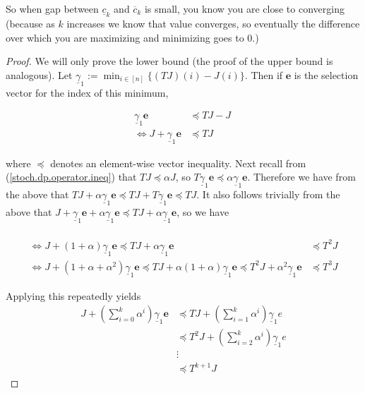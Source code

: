 \begin{enumerate}
\begin{theorem}
\end{theorem}

So when gap between \(\underline{c}_k \) and \(\overline{c}_k \) is small, you know you are close to converging (because as \(k\) increases we know that value converges, so eventually the difference over which you are maximizing and minimizing goes to 0.) 

\begin{proof}

We will only prove the lower bound (the proof of the upper bound is analogous). Let \(\underline{\gamma}_{1} := \min_{i \in [n]} \{ (TJ)(i) - J(i)\}\). Then if \(\boldsymbol{e}\) is the selection vector for the index of this minimum,

\begin{align*}
\underline{\gamma}_{1}\boldsymbol{e}& \preceq TJ - J  
\\ \iff J + \underline{\gamma}_{1}\boldsymbol{e} &  \preceq TJ \qquad 
\end{align*}

where \( \preceq\) denotes an element-wise vector inequality. Next recall from (\ref{stoch.dp.operator.ineq}) that \(TJ \preceq \alpha J\), so \(T \underline{\gamma}_{1}\boldsymbol{e} \preceq \alpha \underline{\gamma}_{1}\boldsymbol{e}\). Therefore we have from the above that \(TJ + \alpha \underline{\gamma}_{1}\boldsymbol{e} \preceq TJ +  T \underline{\gamma}_{1}\boldsymbol{e} \preceq TJ\). It also follows trivially from the above that \(J + \underline{\gamma}_{1}\boldsymbol{e}  + \alpha \underline{\gamma}_{1}\boldsymbol{e}    \preceq TJ  + \alpha \underline{\gamma}_{1}\boldsymbol{e}  \), so we have

\begin{align*}
\\ \iff J + (1  + \alpha) \underline{\gamma}_{1}\boldsymbol{e}\preceq  TJ + \alpha \underline{\gamma}_{1}\boldsymbol{e}& \preceq T^2 J 
\\ \iff J + (1  + \alpha + \alpha^2) \underline{\gamma}_{1}\boldsymbol{e}\preceq TJ + \alpha (1  + \alpha) \underline{\gamma}_{1}\boldsymbol{e}\preceq  T^2J + \alpha^2 \underline{\gamma}_{1}\boldsymbol{e}& \preceq T^3 J 
\end{align*}

Applying this repeatedly yields
\begin{align*}
J + \left( \sum_{i=0}^k \alpha^i  \right) \underline{\gamma}_{1}\boldsymbol{e}& \preceq TJ +  \left( \sum_{i=1}^k \alpha^i  \right) \underline{\gamma}_{1} e
\\ & \preceq T^2J +  \left( \sum_{i=2}^k \alpha^i  \right) \underline{\gamma}_{1} e
\\ & \vdots
\\ & \preceq T^{k+1} J 
\end{align*}


\end{proof}
\end{enumerate}
